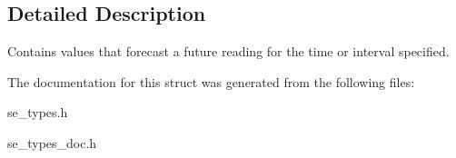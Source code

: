 \subsection{Detailed Description}
Contains values that forecast a future reading for the time or interval specified. 

The documentation for this struct was generated from the following files\+:\begin{DoxyCompactItemize}
\item 
se\+\_\+types.\+h\item 
se\+\_\+types\+\_\+doc.\+h\end{DoxyCompactItemize}
